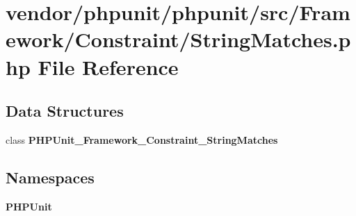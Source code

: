 \section{vendor/phpunit/phpunit/src/\+Framework/\+Constraint/\+String\+Matches.php File Reference}
\label{_string_matches_8php}
\subsection*{Data Structures}
\begin{DoxyCompactItemize}
\item 
class {\bf P\+H\+P\+Unit\+\_\+\+Framework\+\_\+\+Constraint\+\_\+\+String\+Matches}
\end{DoxyCompactItemize}
\subsection*{Namespaces}
\begin{DoxyCompactItemize}
\item 
 {\bf P\+H\+P\+Unit}
\end{DoxyCompactItemize}
